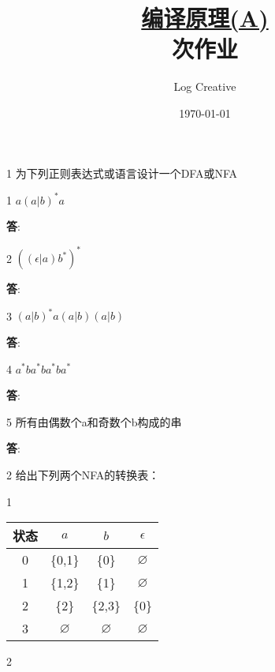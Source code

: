 \documentclass[12pt,a4paper]{article}
\newenvironment{problems}{\begin{list}{}{\renewcommand{\makelabel}[1]{\textbf{##1}\hfil}}}{\end{list}}
\newenvironment{steps}{\begin{list}{}{\renewcommand{\makelabel}[1]{##1)\hfil}}}{\end{list}}
\providecommand{\ans}{\textbf{答}:~}
\begin{document}
\title{\normalsize \underline{编译原理(A)}\\ 次作业}
\author{Log Creative }
\date{\today}
\maketitle

\begin{problems}
    \item[1] 为下列正则表达式或语言设计一个DFA或NFA
    \begin{steps}
        \item[1] $a(a|b)^*a$
        
        \ans 
        \begin{figure}[H]
            
        \end{figure}
        
        \item[2] $((\epsilon|a)b^*)^*$
        
        \ans 
        \begin{figure}[H]
            
        \end{figure}
        
        \item[3] $(a|b)^*a(a|b)(a|b)$
        
        \ans
        \begin{figure}[H]
            
        \end{figure}
        \item[4] $a^*ba^*ba^*ba^*$
        
        \ans
        \begin{figure}[H]
            
        \end{figure}
        \item[5] 所有由偶数个a和奇数个b构成的串
        
        \ans
        \begin{figure}[H]
            
        \end{figure}
    \end{steps} 
    \item[2] 给出下列两个NFA的转换表：
    \begin{steps}
        \item[1]
        
         

         \begin{tabular}{c|ccc}
            状态 & $a$ & $b$ & $\epsilon$\\
             \hline
            0 & \{0,1\} & \{0\} & $\varnothing$\\
            1 & \{1,2\} & \{1\} & $\varnothing$ \\
            2 & \{2\} & \{2,3\} & \{0\} \\
            3 & $\varnothing$ & $\varnothing$ & $\varnothing$
         \end{tabular}
        \item[2] 
        

\end{steps}
\end{problems}
\end{document}
